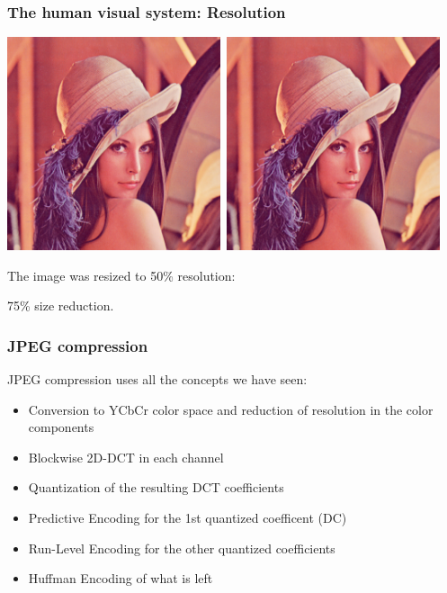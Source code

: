 \documentclass{beamer}
\begin{document}
\begin{frame}
\frametitle{The human visual system: Resolution}

\includegraphics[width=0.47\textwidth]{lena}\ 
\includegraphics[width=0.47\textwidth]{lena-small}

The image was resized to 50\% resolution: 

75\% size reduction.

\end{frame}



\begin{frame}
\frametitle{JPEG compression}
JPEG compression uses all the concepts we have seen:

\begin{itemize}
\item Conversion to YCbCr color space and reduction of resolution in the color components
\item Blockwise 2D-DCT in each channel
\item Quantization of the resulting DCT coefficients
\item Predictive Encoding for the 1st quantized coefficent (DC)
\item Run-Level Encoding for the other quantized coefficients
\item Huffman Encoding of what is left
\end{itemize}
\end{frame}
\end{document}
